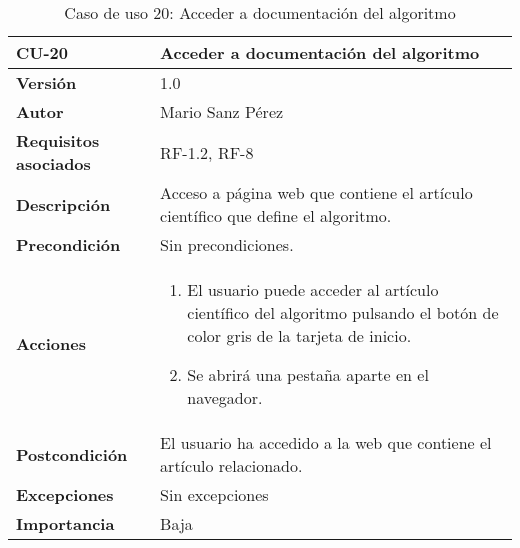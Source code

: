 \begin{table}[p]
	\centering
	\begin{tabularx}{\linewidth}{ p{} p{} }
		\toprule
		\textbf{CU-20}    & \textbf{Acceder a documentación del algoritmo}\\
		\toprule
		\textbf{Versión}              & 1.0    \\
		\textbf{Autor}                & Mario Sanz Pérez \\
		\textbf{Requisitos asociados} & RF-1.2, RF-8 \\
		\textbf{Descripción}          & Acceso a página web que contiene el artículo científico que define el algoritmo. \\
		\textbf{Precondición}         & Sin precondiciones. \\
		\textbf{Acciones}             &
		\begin{enumerate}
			\def\labelenumi{\arabic{enumi}.}
			\tightlist
			\item El usuario puede acceder al artículo científico del algoritmo pulsando el botón de color gris de la tarjeta de inicio.
			\item Se abrirá una pestaña aparte en el navegador.
		\end{enumerate}\\
		\textbf{Postcondición}        & El usuario ha accedido a la web que contiene el artículo relacionado. \\
		\textbf{Excepciones}          & Sin excepciones \\
		\textbf{Importancia}          & Baja \\
		\bottomrule
	\end{tabularx}
	\caption{Caso de uso 20: Acceder a documentación del algoritmo}
\end{table}

